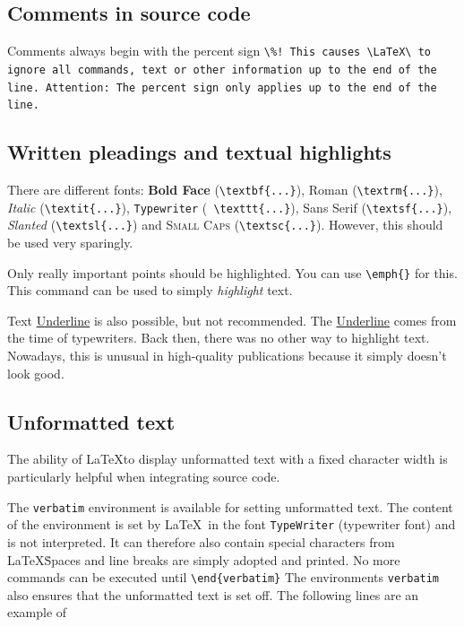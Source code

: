 \documentclass{llncs}
\begin{document}
\subsection{Comments in source code}

Comments always begin with the percent sign \verb|\%! This causes \LaTeX\ to ignore all commands, text or other information up to the end of the line. Attention: The percent sign only applies up to the end of the line.|

\subsection{Written pleadings and textual highlights}

There are different fonts: \textbf{Bold Face} (\verb!\textbf{...}!), \textrm{Roman} (\verb!\textrm{...}!), \textit{Italic} (\verb!\textit{...}!), \texttt{Typewriter} (\verb! \texttt{...}!), \textsf{Sans Serif} (\verb!\textsf{...}!), \textsl{Slanted} (\verb!\textsl{...}!) and \textsc{Small Caps} (\verb!\textsc{...}!). However, this should be used very sparingly.

Only really important points should be highlighted. You can use \verb!\emph{}! for this. This command can be used to simply \emph{highlight} text.

Text \underline{Underline} is also possible, but not recommended. The \underline{Underline} comes from the time of typewriters. Back then, there was no other way to highlight text. Nowadays, this is unusual in high-quality publications because it simply doesn't look good.

\subsection{Unformatted text}

The ability of \LaTeX to display unformatted text with a fixed character width is particularly helpful when integrating source code.

The \texttt{verbatim} environment is available for setting unformatted text. The content of the environment is set by \LaTeX\ in the font \texttt{TypeWriter} (typewriter font) and is not interpreted. It can therefore also contain special characters from \LaTeX\. Spaces and line breaks are simply adopted and printed. No more commands can be executed until \verb!\end{verbatim}! The environments \texttt{verbatim} also ensures that the unformatted text is set off. The following lines are an example of 
\end{document}
